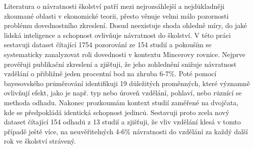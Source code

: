 Literatura o n\'{a}vratnosti \v{s}kolstv\'{i} pat\v{r}\'{i} mezi nejrozs\'{a}hlej\v{s}\'{i} a nejd\.{u}kladn\v{e}ji zkouman\'{e} oblasti v ekonomick\'{e} teorii, p\v{r}esto v\v{e}nuje velmi m\'{a}lo pozornosti probl\'{e}mu dovednostn\'{i}ho zkreslen\'{i}. Dosud neexistuje shoda ohledn\v{e} m\'{i}ry, do jak\'{e} lidsk\'{a} inteligence a schopnost ovliv\v{n}uje n\'{a}vratnost do \v{s}kolstv\'{i}. V t\'{e}to pr\'{a}ci sestavuji dataset \v{c}\'{i}taj\'{i}c\'{i} 1754 pozorov\'{a}n\'{i} ze 154 studi\'{i} a pokou\v{s}\'{i}m se systematicky zanalyzovat roli dovednosti v kontextu Mincerovy rovnice. Nejprve prov\v{e}\v{r}uji publika\v{c}n\'{i} zkreslen\'{i} a zji\v{s}\v{t}uji, \v{z}e jeho zohledn\v{e}n\'{i} sni\v{z}uje n\'{a}vratnost vzd\v{e}l\'{a}n\'{i} o p\v{r}ibli\v{z}n\v{e} jeden procentn\'{i} bod na zhruba 6-7\%. Pot\'{e} pomoc\'{i} bayesovsk\'{e}ho pr\.{u}m\v{e}rov\'{a}n\'{i} identifikuji 19 d\.{u}le\v{z}it\'{y}ch prom\v{e}nn\'{y}ch, kter\'{e} v\'{y}znamn\v{e} ovliv\v{n}uj\'{i} efekt, jako je nap\v{r}. typ nebo \'{u}rove\v{n} vzd\v{e}l\'{a}n\'{i}, pohlav\'{i}, nebo r\.{u}zn\'{i}c\'{i} se methoda odhadu. Nakonec prozkoum\'{a}m kontext studi\'{i} zam\v{e}\v{r}en\'{e} na dvoj\v{c}ata, kde se p\v{r}edpokl\'{a}d\'{a} identick\'{a} schopnost jedinc\.{u}. Sestavuji proto zcela nov\'{y} dataset \v{c}\'{i}taj\'{i}c\'{i} 154 odhad\.{u} z 13 studi\'{i} a zji\v{s}\v{t}uji, \v{z}e vliv vzd\v{e}l\'{a}n\'{i} kles\'{a} v tomto p\v{r}\'{i}pad\v{e} je\v{s}t\v{e} v\'{i}ce, na neuv\v{e}\v{r}iteln\'{y}ch 4-6\% n\'{a}vratnosti do vzd\v{e}l\'{a}n\'{i} za ka\v{z}d\'{y} dal\v{s}\'{i} rok ve \v{s}kolstv\'{i} str\'{a}ven\'{y}.





